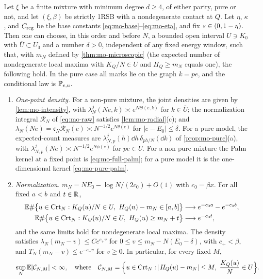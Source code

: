\begin{corollary}\label{cor:mo-interface}
Let $\xi$ be a finite mixture with minimum degree $d\ge4$, of either parity, pure or not, and let $(\xi,\beta)$ be strictly 1RSB with a nondegenerate contact at $Q$. Let $\eta$, $\kappa$, and $C_{\rm reg}$ be the base constants \eqref{eq:mo-base}--\eqref{eq:mo-eta}, and fix $\varepsilon\in(0,1-\eta)$. Then one can choose, in this order and before $N$, a bounded open interval $U\ni K_0$ with $\overline U\subset U_0$ and a number $\delta>0$, independent of any fixed energy window, such that, with $m_N$ defined by \cref{thm:mo-microscopic} (the expected number of nondegenerate local maxima with $K_Q/N\in U$ and $H_Q\ge m_N$ equals one), the following hold. In the pure case all marks lie on the graph $k=pe$, and the conditional law is $\mathbb P_{e,u}$.
\begin{enumerate}
\item[(i)] \emph{One-point density.} For a non-pure mixture, the joint densities are given by \cref{lem:mo-intensity}, with $\lambda_N^j(Ne,k)\asymp e^{N\Theta(e,k)}$ for $k\in\overline U$; the normalization integral $\mathcal R_N$ of \eqref{eq:mo-raw} satisfies \cref{lem:mo-radial}(c); and $\lambda_N(Ne)=\mathfrak c_N\mathcal R_N(e)\asymp N^{-1/2}e^{N\theta(e)}$ for $|e-E_0|\le\delta$. For a pure model, the expected-count measures are $\lambda_{N,p}^j(h)\dd h\,\delta_{ph/N}(\dd k)$ of \cref{prop:mo-pure}(a), with $\lambda_{N,p}^j(Ne)\asymp N^{-1/2}e^{N\phi(e)}$ for $pe\in U$. For a non-pure mixture the Palm kernel at a fixed point is \eqref{eq:mo-full-palm}; for a pure model it is the one-dimensional kernel \eqref{eq:mo-pure-palm}.
\item[(ii)] \emph{Normalization.} $m_N=NE_0-\log N/(2c_0)+O(1)$ with $c_0=\beta x$. For all fixed $a<b$ and $t\in\mathbb R$,
\begin{align*}
\E\#\bigl\{u\in\mathrm{Crt}_N:K_Q(u)/N\in U,\ H_Q(u)-m_N\in[a,b]\bigr\}&\longrightarrow e^{-c_0a}-e^{-c_0b},\\
\E\#\bigl\{u\in\mathrm{Crt}_N:K_Q(u)/N\in U,\ H_Q(u)\ge m_N+t\bigr\}&\longrightarrow e^{-c_0t},
\end{align*}
and the same limits hold for nondegenerate local maxima. The density satisfies $\lambda_N(m_N-v)\le Ce^{c_+v}$ for $0\le v\le m_N-N(E_0-\delta)$, with $c_+<\beta$, and $T_N(m_N+v)\le e^{-c_-v}$ for $v\ge0$. In particular, for every fixed $M$,
\begin{equation}\label{eq:mo-CNM}
\sup_N\E|\mathcal C_{N,M}|<\infty,\quad\text{where}\quad\mathcal C_{N,M}=\Bigl\{u\in\mathrm{Crt}_N:|H_Q(u)-m_N|\le M,\ \frac{K_Q(u)}N\in U\Bigr\}.

\end{equation}
\end{enumerate}
\end{corollary}
